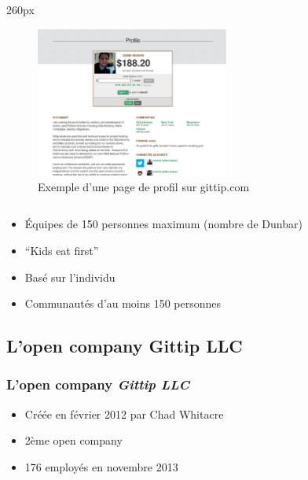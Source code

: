 {
\logo{}
\begin{frame}
\begin{center}
\begin{columns}
\begin{column}{260px}
{
    \begin{figure}[h!]
        \centering
        \includegraphics[width=240px]{images/section1/profilepage-gittip.eps}
        \caption{Exemple d'une page de profil sur gittip.com}
    \end{figure}
}
\end{column}
\end{columns}
\end{center}
\end{frame}
}


\begin{frame}

\begin{itemize}
    \itemsep1.5em
    \item Équipes de 150 personnes maximum (nombre de Dunbar)
    \item ``Kids eat first''
    \item Basé sur l'individu
    \item Communautés d'au moins 150 personnes
\end{itemize}
\end{frame}

    \subsection{L'open company Gittip LLC}


\begin{frame}
\frametitle{L'open company \emph{Gittip LLC}}

\begin{itemize}
    \itemsep1.5em
    \item Créée en février 2012 par Chad Whitacre
    \item 2ème open company
    \item 176 employés en novembre 2013
\end{itemize}
\end{frame}


